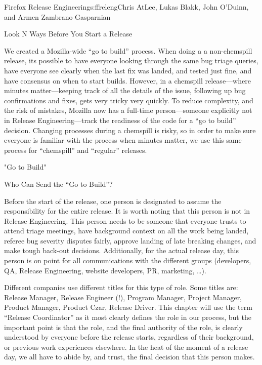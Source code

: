 \begin{aosachapter}{Firefox Release Engineering}{s:ffreleng}{Chris AtLee, Lukas Blakk, John O'Duinn, and Armen Zambrano Gasparnian}
\begin{aosasect1}{Look N Ways Before You Start a Release}
\begin{aosaenumerate}
\item We created a Mozilla-wide ``go to build'' process. When doing a
  a non-chemspill release, its possible to have everyone looking
  through the same bug triage queries, have everyone see clearly when
  the last fix was landed, and tested just fine, and have consensus on
  when to start builds. However, in a chemspill release---where
  minutes matter---keeping track of all the details of the issue,
  following up bug confirmations and fixes, gets very tricky very
  quickly.  To reduce complexity, and the risk of mistakes, Mozilla
  now has a full-time person---someone explicitly not in Release
  Engineering---track the readiness of the code for a ``go to build''
  decision.  Changing processes during a chemspill is risky, so in
  order to make sure everyone is familiar with the process when
  minutes matter, we use this same process for ``chemspill'' and
  ``regular'' releases.

\end{aosaenumerate}


\end{aosasect1}

\begin{aosasect1}{"Go to Build"}


\begin{aosasect2}{Who Can Send the ``Go to Build''?}

Before the start of the release, one person is designated to assume
the responsibility for the entire release. It is worth noting that
this person is not in Release Engineering. This person needs to be
someone that everyone trusts to attend triage meetings, have
background context on all the work being landed, referee bug severity
disputes fairly, approve landing of late breaking changes, and make
tough back-out decisions.  Additionally, for the actual release day,
this person is on point for all communications with the different
groups (developers, QA, Release Engineering, website developers, PR,
marketing, {\ldots}).

Different companies use different titles for this type of role.  Some
titles are: Release Manager, Release Engineer (!), Program Manager,
Project Manager, Product Manager, Product Czar, Release Driver. This
chapter will use the term ``Release Coordinator'' as it most clearly
defines the role in our process, but the important point is that the
role, and the final authority of the role, is clearly understood by
everyone before the release starts, regardless of their background, or
previous work experiences elsewhere. In the heat of the moment of a
release day, we all have to abide by, and trust, the final decision
that this person makes.


\end{aosasect2}
\end{aosasect1}
\end{aosachapter}
